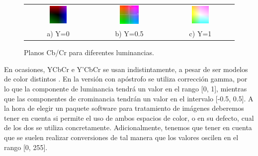 \begin{figure}[h!]
    \centering
    \begin{tabular}{ccc}
          \includegraphics[width=0.28\textwidth,height=0.28\textheight,keepaspectratio]{imagenes/parte_BS/YCbCr_Y0.png} & \includegraphics[width=0.28\textwidth,height=0.28\textheight,keepaspectratio]{imagenes/parte_BS/YCbCr_Y50.png} &
          \includegraphics[width=0.28\textwidth,height=0.28\textheight,keepaspectratio]{imagenes/parte_BS/YCbCr_Y100.png} \\
          a) Y=0 & b) Y=0.5 & c) Y=1\\
     \end{tabular}
     \caption{Planos Cb/Cr para diferentes luminancias.}
     \label{fig:planosycbcr}
\end{figure}

En ocasiones, YCbCr e Y’CbCr se usan indistintamente, a pesar de ser modelos de color distintos \cite{moredigitalvideo}. En la versión con apóstrofo se utiliza corrección gamma, por lo que la componente de luminancia tendrá un valor en el rango [0, 1], mientras que las componentes de crominancia tendrán un valor en el intervalo [-0.5, 0.5]. A la hora de elegir un paquete software para tratamiento de imágenes deberemos tener en cuenta si permite el uso de ambos espacios de color, o en su defecto, cual de los dos se utiliza concretamente. Adicionalmente, tenemos que tener en cuenta que se suelen realizar conversiones de tal manera que los valores oscilen en el rango [0, 255].

